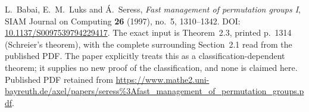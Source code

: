 L.~Babai, E.~M.~Luks and \'A.~Seress,
\emph{Fast management of permutation groups I},
SIAM Journal on Computing \textbf{26} (1997), no.~5, 1310--1342.
DOI: \href{https://doi.org/10.1137/S0097539794229417}{10.1137/S0097539794229417}.
The exact input is Theorem~2.3, printed p.~1314 (Schreier's theorem),
with the complete surrounding Section~2.1 read from the published PDF.
The paper explicitly treats this as a classification-dependent theorem;
it supplies no new proof of the classification, and none is claimed here.
Published PDF retained from
\url{https://www.mathe2.uni-bayreuth.de/axel/papers/seress%3Afast_management_of_permutation_groups.pdf}.

